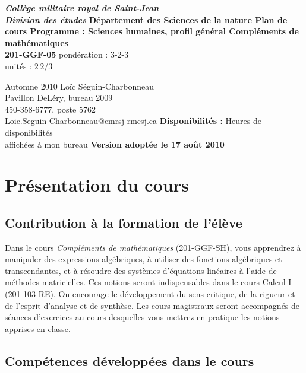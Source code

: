 \documentclass[fleqn,twoside,12pt,letterpaper]{article}
\begin{document}
\begin{titlepage}\centering
\textbf{\textit{\Large Collège militaire royal de Saint-Jean\\Division des études}}
\vfill
{\large\bfseries
Département des Sciences de la nature
\vfill
Plan de cours
\vfill
Programme : Sciences humaines, profil général
\vfill
Compléments de mathématiques\\ 201-GGF-05
}
\vfill
pondération : 3-2-3\\
unités : $2\,2/3$
\vfill

\vfill
Automne 2010
\vfill
Loïc Séguin-Charbonneau\\
Pavillon DeLéry, bureau 2009\\
450-358-6777, poste 5762\\
\url{Loic.Seguin-Charbonneau@cmrsj-rmcsj.ca}
\vfill
\textbf{\large Disponibilités :}
Heures de disponibilités\\
affichées à mon bureau
\vfill
\textbf{\large Version adoptée le 17 août 2010}


\end{titlepage}\newpage


\section{Présentation du cours}

\subsection{Contribution à la formation de l'élève}

Dans le cours \emph{Compléments de mathématiques} (201-GGF-SH), vous apprendrez
à manipuler des expressions algébriques, à utiliser des fonctions algébriques et
transcendantes, et à résoudre des systèmes d'équations linéaires à l'aide de
méthodes matricielles. Ces notions seront indispensables dans le cours Calcul I
(201-103-RE). On encourage le développement du sens
critique, de la rigueur et de l'esprit d'analyse et de synthèse. Les cours
magistraux seront accompagnés de séances d'exercices au cours desquelles vous
mettrez en pratique les notions apprises en classe.

\subsection{Compétences développées dans le cours}
\end{document}
